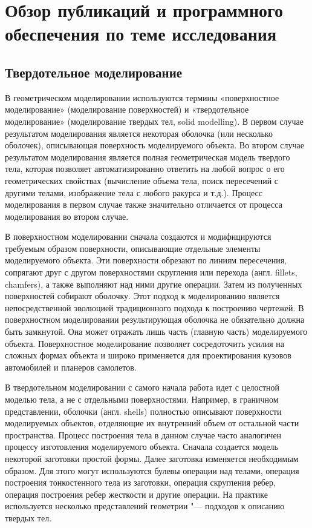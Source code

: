\chapter{Обзор публикаций и программного обеспечения по теме исследования} \label{chapt1}

\section{Твердотельное моделирование} \label{solid_modeling}

В геометрическом моделировании используются термины «поверхностное моделирование» (моделирование поверхностей) и «твердотельное моделирование» (моделирование твердых тел, solid modelling). В первом случае результатом моделирования является некоторая оболочка (или несколько оболочек), описывающая поверхность моделируемого объекта. Во втором случае результатом моделирования является полная геометрическая модель твердого тела, которая позволяет автоматизированно ответить на любой вопрос о его геометрических свойствах (вычисление объема тела, поиск пересечений с другими телами, изображение тела с любого ракурса и т.д.). Процесс моделирования в первом случае также значительно отличается от процесса моделирования во втором случае.

В поверхностном моделировании сначала создаются и модифицируются требуемым образом поверхности, описывающие отдельные элементы моделируемого объекта. Эти поверхности обрезают по линиям пересечения, сопрягают друг с другом поверхностями скругления или перехода (англ. fillets, chamfers), а также выполняют над ними другие операции. Затем из полученных поверхностей собирают оболочку. Этот подход к моделированию является непосредственной эволюцией традиционного подхода к построению чертежей. В поверхностном моделировании результирующая оболочка не обязательно должна быть замкнутой. Она может отражать лишь часть (главную часть) моделируемого объекта. Поверхностное моделирование позволяет сосредоточить усилия на сложных формах объекта и широко применяется для проектирования кузовов автомобилей и планеров самолетов.

В твердотельном моделировании с самого начала работа идет с целостной моделью тела, а не с отдельными поверхностями. Например, в граничном представлении, оболочки (англ. shells) полностью описывают поверхности моделируемых объектов, отделяющие их внутренний объем от остальной части пространства. Процесс построения тела в данном случае часто аналогичен процессу изготовления моделируемого объекта. Сначала создается модель некоторой заготовки простой формы. Далее заготовка изменяется необходимым образом. Для этого могут используются булевы операции над телами, операция построения тонкостенного тела из заготовки, операция скругления ребер, операция построения ребер жесткости и другие операции. На практике используется несколько представлений геометрии "--- подходов к описанию твердых тел.


